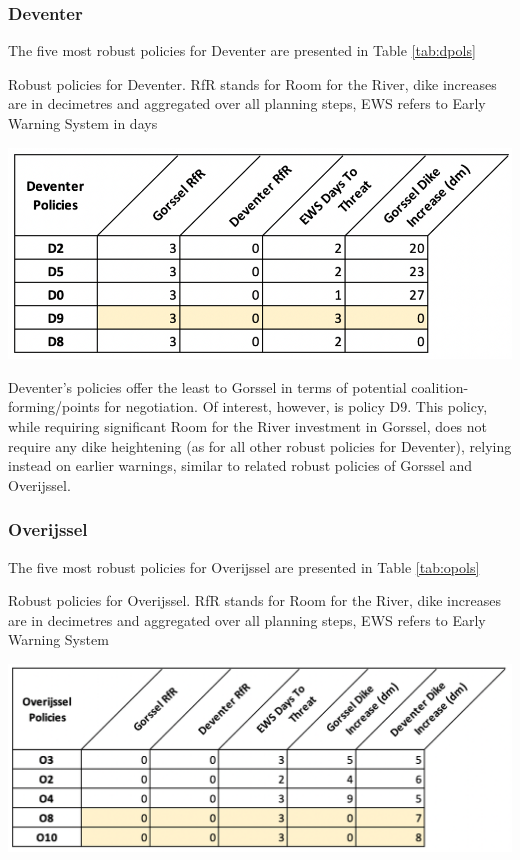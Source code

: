 \subsubsection{Deventer}
The five most robust policies for Deventer are presented in Table \ref{tab:dpols}

\begin{table}[h!]
  \centering
  \captionsetup{justification=centering,margin=2cm}
  \caption{Robust policies for Deventer. RfR stands for Room for the River, dike increases are in decimetres and aggregated over all planning steps, EWS refers to Early Warning System in days}
  \label{tab:dpols}
  \includegraphics[width=0.8\linewidth]{report/figures/dpols.png}
\end{table}

Deventer's policies offer the least to Gorssel in terms of potential coalition-forming/points for negotiation. Of interest, however, is policy D9. This policy, while requiring significant Room for the River investment in Gorssel, does not require any dike heightening (as for all other robust policies for Deventer), relying instead on earlier warnings, similar to related robust policies of Gorssel and Overijssel.

\subsubsection{Overijssel}
The five most robust policies for Overijssel are presented in Table \ref{tab:opols}

\begin{table}[h!]
  \centering
  \captionsetup{justification=centering,margin=2cm}
  \caption{Robust policies for Overijssel. RfR stands for Room for the River, dike increases are in decimetres and aggregated over all planning steps, EWS refers to Early Warning System}
  \label{tab:opols}
  \includegraphics[width=0.8\linewidth]{report/figures/opols.png}
\end{table}


